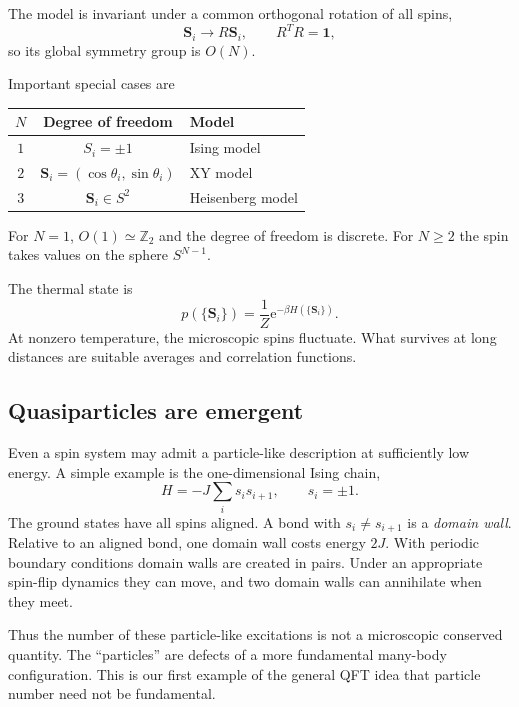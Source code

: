\documentclass[11pt]{article}
\newcommand{\e}{\mathrm{e}}
\begin{document}
The model is invariant under a common orthogonal rotation of all spins,
\begin{equation}
  \bm S_i\longrightarrow R\bm S_i,
  \qquad
  R^T R=\mathbf 1,
\end{equation}
so its global symmetry group is $O(N)$.

Important special cases are
\begin{center}
\begin{tabular}{ccl}
\toprule
$N$ & Degree of freedom & Model \\
\midrule
$1$ & $S_i=\pm1$ & Ising model \\
$2$ & $\bm S_i=(\cos\theta_i,\sin\theta_i)$ & XY model \\
$3$ & $\bm S_i\in S^2$ & Heisenberg model \\
\bottomrule
\end{tabular}
\end{center}
For $N=1$, $O(1)\simeq \mathbb Z_2$ and the degree of freedom is discrete.  For $N\ge2$ the spin takes values on the sphere $S^{N-1}$.

The thermal state is
\begin{equation}
  p(\{\bm S_i\})=\frac{1}{Z}\e^{-\beta H(\{\bm S_i\})}.
\end{equation}
At nonzero temperature, the microscopic spins fluctuate.  What survives at long distances are suitable averages and correlation functions.

\subsection{Quasiparticles are emergent}

Even a spin system may admit a particle-like description at sufficiently low energy.  A simple example is the one-dimensional Ising chain,
\begin{equation}
  H=-J\sum_i s_i s_{i+1},
  \qquad s_i=\pm1.
\end{equation}
The ground states have all spins aligned.  A bond with $s_i\neq s_{i+1}$ is a \emph{domain wall}.  Relative to an aligned bond, one domain wall costs energy $2J$.  With periodic boundary conditions domain walls are created in pairs.  Under an appropriate spin-flip dynamics they can move, and two domain walls can annihilate when they meet.

Thus the number of these particle-like excitations is not a microscopic conserved quantity.  The ``particles'' are defects of a more fundamental many-body configuration.  This is our first example of the general QFT idea that particle number need not be fundamental.
\end{document}

